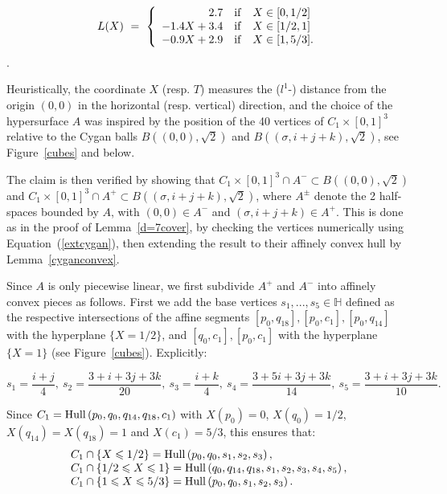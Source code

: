 \documentclass{article}[12pt]
\newcommand{\quat}{\mathbb{H}}
\begin{document}
$$ L(X) \ = \ \left\{\begin{array}{rcl}
2.7 & {\rm if} & X \in [0,1/2] \\
-1.4 X + 3.4 & {\rm if} & X \in [1/2,1]  \\
-0.9 X + 2.9 & {\rm if} & X \in [1, 5/3]. 
\end{array}\right.
$$.

Heuristically, the coordinate $X$ (resp. $T$) measures the ($l^1$-) distance from the origin $(0,0)$ in the horizontal (resp. vertical) direction, and the choice of the hypersurface $A$ was inspired by the position of the 40 vertices of $C_1 \times [0,1]^3$ relative to the Cygan balls $B\left((0,0),\sqrt{2}\right)$ and $B\left((\sigma,i+j+k),\sqrt{2}\right)$, see Figure~\ref{cubes} and below. 

 The claim is then verified by showing that $C_1 \times [0,1]^3 \cap A^- \subset B\left((0,0),\sqrt{2}\right)$ and $C_1 \times [0,1]^3 \cap A^+ \subset B\left((\sigma,i+j+k),\sqrt{2}\right)$, where $A^{\pm}$ denote the 2 half-spaces bounded by $A$, with $(0,0) \in A^-$ and $(\sigma,i+j+k) \in A^+$. This is done as in the proof of Lemma~\ref{d=7cover},  by checking the vertices numerically using Equation~(\ref{extcygan}), then extending the result to their affinely convex hull by Lemma~\ref{cyganconvex}. 
 
 Since $A$ is only piecewise linear, we first subdivide $A^+$ and $A^-$ into affinely convex pieces as follows. First we add the base vertices $s_1,...,s_5 \in \quat$ defined as the respective intersections of the affine segments $[p_0,q_{18}],[p_0,c_1], [p_0,q_{14}]$ with the hyperplane $\{ X=1/2 \}$, and $[q_0,c_1],[p_0,c_1]$ with the hyperplane $\{ X=1\}$ (see Figure~\ref{cubes}). Explicitly:
 
 $$s_1=\frac{i+j}{4}, \ s_2=\frac{3+i+3j+3k}{20}, \ s_3=\frac{i+k}{4}, \  s_4=\frac{3+5i+3j+3k}{14}, \ s_5=\frac{3+i+3j+3k}{10}.
 $$
 
 
 Since $C_1={\rm Hull}\left(p_0,q_0,q_{14},q_{18},c_1\right)$ with $X(p_0)=0$, $X(q_0)=1/2$, $X(q_{14})=X(q_{18})=1$ and $X(c_1)=5/3$, this ensures that: 
 $$\begin{array}{l}
 C_1\cap \{ X \leqslant 1/2 \} ={\rm Hull}\left(p_0,q_0,s_1,s_2,s_3\right), \\
 C_1\cap \{ 1/2 \leqslant X \leqslant 1 \} ={\rm Hull}\left(q_0,q_{14},q_{18}, s_1,s_2,s_3,s_4,s_5\right), \\ 
 C_1\cap \{ 1 \leqslant X \leqslant 5/3 \} ={\rm Hull}\left(p_0,q_0,s_1,s_2,s_3\right).
 \end{array}$$ 
 
\end{document}
